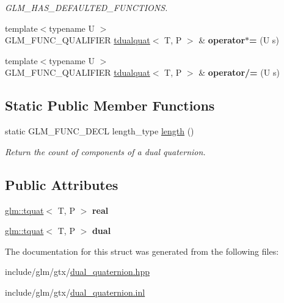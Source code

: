\begin{DoxyCompactItemize}
\begin{DoxyCompactList}\small\item\em G\+L\+M\+\_\+\+H\+A\+S\+\_\+\+D\+E\+F\+A\+U\+L\+T\+E\+D\+\_\+\+F\+U\+N\+C\+T\+I\+O\+NS. \end{DoxyCompactList}\item 
\mbox{\label{structglm_1_1tdualquat_a0364e641b3b352f8c3eaa98fc952c737}} 
{\footnotesize template$<$typename U $>$ }\\G\+L\+M\+\_\+\+F\+U\+N\+C\+\_\+\+Q\+U\+A\+L\+I\+F\+I\+ER \hyperlink{structglm_1_1tdualquat}{tdualquat}$<$ T, P $>$ \& {\bfseries operator$\ast$=} (U s)
\item 
\mbox{\label{structglm_1_1tdualquat_a1843b865427cf6d2e474959376a1c412}} 
{\footnotesize template$<$typename U $>$ }\\G\+L\+M\+\_\+\+F\+U\+N\+C\+\_\+\+Q\+U\+A\+L\+I\+F\+I\+ER \hyperlink{structglm_1_1tdualquat}{tdualquat}$<$ T, P $>$ \& {\bfseries operator/=} (U s)
\end{DoxyCompactItemize}
\subsection*{Static Public Member Functions}
\begin{DoxyCompactItemize}
\item 
\mbox{\label{structglm_1_1tdualquat_a9c6d83c895e67bee1a99ab7b60d3cf1d}} 
static G\+L\+M\+\_\+\+F\+U\+N\+C\+\_\+\+D\+E\+CL length\+\_\+type \hyperlink{structglm_1_1tdualquat_a9c6d83c895e67bee1a99ab7b60d3cf1d}{length} ()
\begin{DoxyCompactList}\small\item\em Return the count of components of a dual quaternion. \end{DoxyCompactList}\end{DoxyCompactItemize}
\subsection*{Public Attributes}
\begin{DoxyCompactItemize}
\item 
\mbox{\label{structglm_1_1tdualquat_a402b3ac8410bd71a27f811dced8db14e}} 
\hyperlink{structglm_1_1tquat}{glm\+::tquat}$<$ T, P $>$ {\bfseries real}
\item 
\mbox{\label{structglm_1_1tdualquat_abeea1eb15f230d3bc50740c3811e1fd3}} 
\hyperlink{structglm_1_1tquat}{glm\+::tquat}$<$ T, P $>$ {\bfseries dual}
\end{DoxyCompactItemize}


The documentation for this struct was generated from the following files\+:\begin{DoxyCompactItemize}
\item 
include/glm/gtx/\hyperlink{dual__quaternion_8hpp}{dual\+\_\+quaternion.\+hpp}\item 
include/glm/gtx/\hyperlink{dual__quaternion_8inl}{dual\+\_\+quaternion.\+inl}\end{DoxyCompactItemize}
